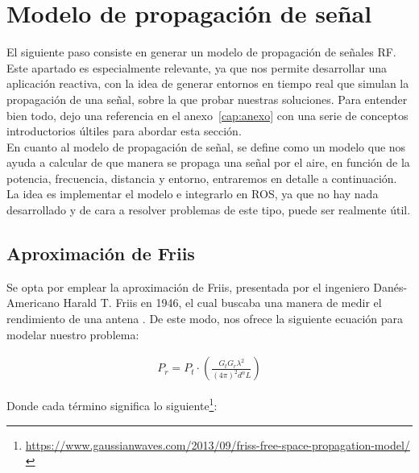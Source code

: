 \section{Modelo de propagación de señal}
\label{sec:signals}

El siguiente paso consiste en generar un modelo de propagación de señales \ac{RF}. Este apartado es especialmente relevante, ya que nos permite desarrollar una aplicación reactiva, con la idea de generar entornos en tiempo real que simulan la propagación de una señal, sobre la que probar nuestras soluciones. Para entender bien todo, dejo una referencia en el anexo~\ref{cap:anexo} con una serie de conceptos introductorios últiles para abordar esta sección.\\

En cuanto al modelo de propagación de señal, se define como un modelo que nos ayuda a calcular de que manera se propaga una señal por el aire, en función de la potencia, frecuencia, distancia y entorno, entraremos en detalle a continuación. La idea es implementar el modelo e integrarlo en \ac{ROS}, ya que no hay nada desarrollado y de cara a resolver problemas de este tipo, puede ser realmente útil.\\

\subsection{Aproximación de Friis}
\label{subsec:friis}

Se opta por emplear la aproximación de Friis, presentada por el ingeniero Danés-Americano Harald T. Friis en 1946, el cual buscaba una manera de medir el rendimiento de una antena \cite{johnson1984antenna}. De este modo, nos ofrece la siguiente ecuación para modelar nuestro problema:

\begin{align}
    P_r = P_t \cdot \left( \frac{G_t G_r \lambda^2 }{(4 \pi)^2 d^n L} \right)
\end{align}

Donde cada término significa lo siguiente\footnote[3]{\url{https://www.gaussianwaves.com/2013/09/friss-free-space-propagation-model/}}:

